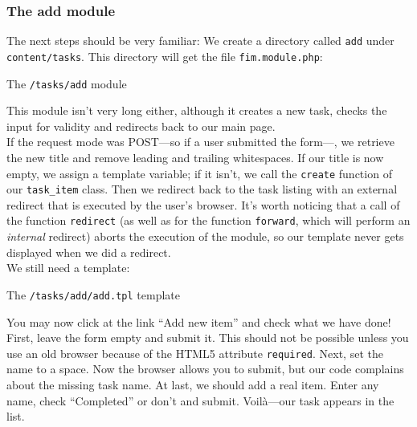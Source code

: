 \documentclass{scrartcl}
\begin{document}
   \subsubsection{The add module}
      The next steps should be very familiar: We create a directory called \texttt{add} under \texttt{content/tasks}. This directory will get the file \texttt{fim.module.php}:
      \begin{listing}[H]
         \caption{The \texttt{/tasks/add} module}
      \end{listing}
      This module isn't very long either, although it creates a new task, checks the input for validity and redirects back to our main page. \\
      If the request mode was POST---so if a user submitted the form---, we retrieve the new title and remove leading and trailing whitespaces. If our title is now empty, we assign a template variable; if it isn't, we call the \lstinline!create! function of our \lstinline!task_item! class. Then we redirect back to the task listing with an external redirect that is executed by the user's browser. It's worth noticing that a call of the function \lstinline!redirect! (as well as for the function \lstinline!forward!, which will perform an \emph{internal} redirect) aborts the execution of the module, so our template never gets displayed when we did a redirect. \\
      We still need a template:
      \begin{listing}[H]
         \caption{The \texttt{/tasks/add/add.tpl} template}
      \end{listing}
      You may now click at the link ``Add new item'' and check what we have done! First, leave the form empty and submit it. This should not be possible unless you use an old browser because of the HTML5 attribute \texttt{required}. Next, set the name to a space. Now the browser allows you to submit, but our code complains about the missing task name. At last, we should add a real item. Enter any name, check ``Completed'' or don't and submit. Voilà---our task appears in the list.
\end{document}
